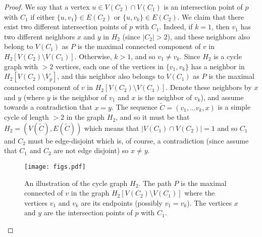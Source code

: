 \documentclass{article}
\theoremstyle{definition}
\begin{document}
\begin{proof}
We say that a vertex $u \in V(C_{2}) \cap V(C_{1})$ is an intersection point of $p$ with $C_{1}$ if either $\{u,v_{1}\} \in E(C_{2})$ or $\{u,v_{k}\} \in E(C_{2})$. We claim that there exist two different intersection points of $p$ with $C_{1}$.
Indeed, if $k = 1$, then $v_{1}$ has two different neighbors $x$ and $y$ in $H_{2}$ (since $|C_{2}| > 2$), and these neighbors also belong to $V(C_{1})$ as $P$ is the maximal connected component of $v$ in $H_{2}[V(C_{2}) \setminus V(C_{1})]$.
Otherwise, $k > 1$, and so $v_{1} \ne v_{k}$. Since $H_{2}$ is a cycle graph with $> 2$ vertices, each one of the vertices in $\{v_{1}, v_{k}\}$ has a neighbor in $H_{2}[V(C_{2}) \setminus V_{p}]$, and this neighbor also belongs to $V(C_{1})$ as $P$ is the maximal connected component of $v$ in $H_{2}[V(C_{2}) \setminus V(C_{1})]$.
Denote these neighbors by $x$ and $y$ (where $y$ is the neighbor of $v_{1}$ and $x$ is the neighbor of $v_{k}$), and assume towards a contradiction that $x = y$. The sequence $\tilde{C} = (v_{1},...v_{k},x)$ is a simple cycle of length $> 2$ in the graph $H_{2}$, and so it must be that $H_{2} = (V(\tilde{C}),E(\tilde{C}))$ which means that $|V(C_{1}) \cap V(C_{2})| = 1$ and so $C_{1}$ and $C_{2}$ must be edge-disjoint which is, of course, a contradiction (since assume that $C_1$ and $C_2$ are not edge disjoint) so $x \ne y$.
%
\begin{figure}[!ht]
	\centering
	\texttt{[image: figs.pdf]}
	\caption{An illustration of the cycle graph $H_2$. The path $P$ is the maximal connected of $v$ in the graph $H_2[V(C_2) \setminus V(C_1)]$ where the vertices $v_1$ and $v_k$ are its endpoints (possibly $v_1 = v_k$). The vertices $x$ and $y$ are the intersection points of $p$ with $C_1$.}
\end{figure}


\end{proof}
\end{document}
